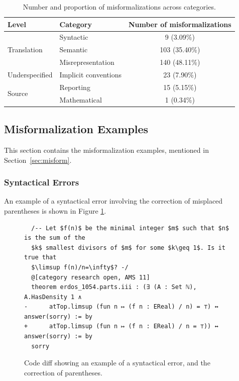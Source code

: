 \begin{table}[H]
    \centering
    \caption{Number and proportion of misformalizations across categories.}
    \label{tab:misform_table}
    \begin{tabular}{llc}
        \textbf{Level} & \textbf{Category} & \textbf{Number of misformalizations} \\
        \toprule
        \multirow{3}{*}{Translation} & Syntactic & 9 (3.09\%)\\
        \cmidrule{2-3}
        & Semantic & 103 (35.40\%)\\
        \cmidrule{2-3}
        & Misrepresentation & 140 (48.11\%) \\
        \midrule
        Underspecified & Implicit conventions & 23 (7.90\%) \\
        \midrule
        \multirow{2}{*}{Source} & Reporting & 15 (5.15\%)\\
        \cmidrule{2-3}
        & Mathematical & 1 (0.34\%) \\
        \bottomrule
    \end{tabular}
\end{table}

\subsection{Misformalization Examples}\label{sec:app_misformalization_examples}

This section contains the misformalization examples, mentioned in Section~\ref{sec:misform}. 

\subsubsection{Syntactical Errors}

An example of a syntactical error involving the correction of misplaced parentheses is shown in Figure \ref{fig:misform_syntactic_erdos1054}.

\begin{figure}[h]
    \centering
    \begin{verbatim}
  /-- Let $f(n)$ be the minimal integer $m$ such that $n$ is the sum of the 
  $k$ smallest divisors of $m$ for some $k\geq 1$. Is it true that 
  $\limsup f(n)/n=\infty$? -/
  @[category research open, AMS 11]
  theorem erdos_1054.parts.iii : (∃ (A : Set ℕ), A.HasDensity 1 ∧
-      atTop.limsup (fun n ↦ (f n : EReal) / n) = ⊤) ↔ answer(sorry) := by
+      atTop.limsup (fun n ↦ (f n : EReal) / n = ⊤)) ↔ answer(sorry) := by
  sorry
    \end{verbatim}
    \caption{Code diff showing an example of a syntactical error, and the correction of parentheses.}
    \label{fig:misform_syntactic_erdos1054}
\end{figure}

